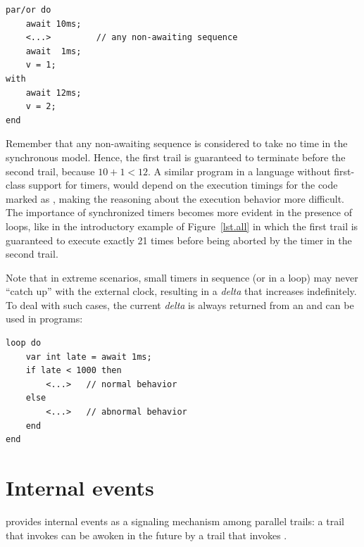 \nopagebreak
\noindent
\begin{minipage}{\linewidth}
\begin{lstlisting}[xleftmargin=2em]
par/or do
    await 10ms;
    <...>         // any non-awaiting sequence
    await  1ms;
    v = 1;
with
    await 12ms;
    v = 2;
end
\end{lstlisting}
\end{minipage}

Remember that any non-awaiting sequence is considered to take no time in the 
synchronous model.
Hence, the first trail is guaranteed to terminate before the second trail, 
because $10+1 < 12$.
A similar program in a language without first-class support for timers, would 
depend on the execution timings for the code marked as , making the 
reasoning about the execution behavior more difficult.
%
The importance of synchronized timers becomes more evident in the presence of 
loops, like in the introductory example of Figure~\ref{lst.all} in which the 
first trail is guaranteed to execute exactly 21 times before being aborted by 
the timer in the second trail.

Note that in extreme scenarios, small timers in sequence (or in a loop) may 
never ``catch up'' with the external clock, resulting in a \emph{delta} that
increases indefinitely.
To deal with such cases, the current \emph{delta} is always returned from an 
 and can be used in programs:

\begin{lstlisting}
loop do
    var int late = await 1ms;
    if late < 1000 then
        <...>   // normal behavior
    else
        <...>   // abnormal behavior
    end
end
\end{lstlisting}


\section{Internal events}
\label{sec.ceu.ints}


\CEU provides internal events as a signaling mechanism among parallel trails:
a trail that invokes  can be awoken in the future by a trail that 
invokes .

